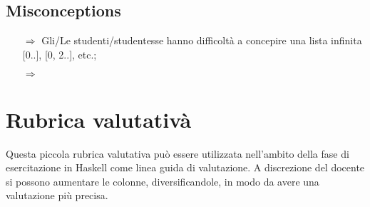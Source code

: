 \subsection{Misconceptions}

\begin{itemize}
    \item [$\Rightarrow$] Gli/Le studenti/studentesse hanno difficoltà a concepire una lista infinita [0..], [0, 2..], etc.;
    \item [$\Rightarrow$] 
\end{itemize}

\pagebreak
\section{Rubrica valutativà}

Questa piccola rubrica valutativa può essere utilizzata nell'ambito della fase di esercitazione in Haskell
come linea guida di valutazione. A discrezione del docente si possono aumentare le colonne, diversificandole, in modo da avere una valutazione più precisa.



